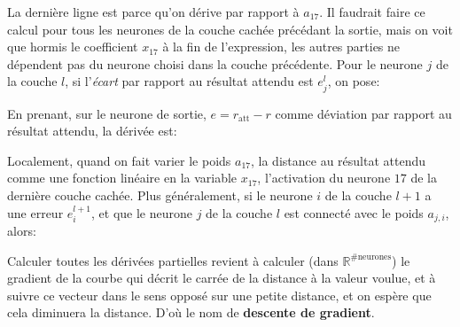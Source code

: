 \documentclass[a4paper]{article}
\def\ffrac#1#2{\frac{\displaystyle #1}{\displaystyle #2}}
\begin{document}
La dernière ligne est parce qu'on dérive par rapport à \(a_{17}\). Il
faudrait faire ce calcul pour tous les neurones de la couche cachée
précédant la sortie, mais on voit que hormis le coefficient \(x_{17}\)
à la fin de l'expression, les autres parties ne dépendent pas du
neurone choisi dans la couche précédente. Pour le neurone \(j\) de la
couche \(l\), si l'\emph{écart} par rapport au résultat attendu est
\(e^l_j\), on pose:
\begin{center}
\end{center}
En prenant, sur le neurone de sortie, \( e = r_{\text{att}} - r \) comme
déviation par rapport au résultat attendu, la dérivée est:
\begin{center}
  \fbox{\parbox{0.9\textwidth}{
      \[
        \ffrac{\partial E}{\partial a_{17}} = -  z_{\text{sortie}} \cdot x_{17}
      \]
    }}
\end{center}
Localement, quand on fait varier le poids \(a_{17}\), la distance au
résultat attendu comme une fonction linéaire en la variable
\(x_{17}\), l'activation du neurone \(17\) de la dernière couche
cachée.  Plus généralement, si le neurone \(i\) de la couche \(l+1\) a
une erreur \(e^{l+1}_i\), et que le neurone \(j\) de la couche \(l\)
est connecté avec le poids \(a_{j,i}\), alors:
\begin{center}
  \fbox{
    \parbox{0.9\textwidth}{
  \[
    \ffrac{\partial e^{l+1}_i}{\partial a_{j,i}} = - z_i^{l+1} \cdot x^l_{j}
  \]
}}
\end{center}
Calculer toutes les dérivées partielles revient à calculer (dans
\(\mathbb{R}^{\# \text{neurones}}\)) le gradient de la courbe qui
décrit le carrée de la distance à la valeur voulue, et à suivre ce
vecteur dans le sens opposé sur une petite distance, et on espère que
cela diminuera la distance. D'où le nom de \textbf{descente de gradient}.
\end{document}
